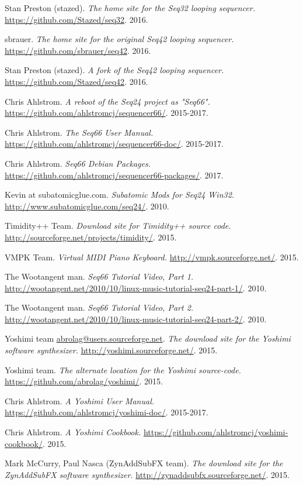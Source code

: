 \begin{thebibliography}{99}
   Stan Preston (stazed).
   \emph{The home site for the Seq32 looping sequencer.}
   \url{https://github.com/Stazed/seq32}.
   2016.

   sbrauer.
   \emph{The home site for the original Seq42 looping sequencer.}
   \url{https://github.com/sbrauer/seq42}.
   2016.

   Stan Preston (stazed).
   \emph{A fork of the Seq42 looping sequencer.}
   \url{https://github.com/Stazed/seq42}.
   2016.

   Chris Ahlstrom.
   \emph{A reboot of the Seq24 project as "Seq66".}
   \url{https://github.com/ahlstromcj/sequencer66/}.
   2015-2017.

   Chris Ahlstrom.
   \emph{The Seq66 User Manual.}
   \url{https://github.com/ahlstromcj/sequencer66-doc/}.
   2015-2017.

   Chris Ahlstrom.
   \emph{Seq66 Debian Packages.}
   \url{https://github.com/ahlstromcj/sequencer66-packages/}.
   2017.

   Kevin at subatomicglue.com.
   \emph{Subatomic Mods for Seq24 Win32.}
   \url{http://www.subatomicglue.com/seq24/}.
   2010.

   Timidity++ Team.
   \emph{Download site for Timidity++ source code.}
   \url{http://sourceforge.net/projects/timidity/}.
   2015.

   VMPK Team.
   \emph{Virtual MIDI Piano Keyboard.}
   \url{http://vmpk.sourceforge.net/}.
   2015.

   The Wootangent man.
   \emph{Seq66 Tutorial Video, Part 1.}
   \url{http://wootangent.net/2010/10/linux-music-tutorial-seq24-part-1/}.
   2010.

   The Wootangent man.
   \emph{Seq66 Tutorial Video, Part 2.}
   \url{http://wootangent.net/2010/10/linux-music-tutorial-seq24-part-2/}.
   2010.

   Yoshimi team \url{abrolag@users.sourceforge.net}.
   \emph{The download site for the Yoshimi software synthesizer.}
   \url{http://yoshimi.sourceforge.net/}.
   2015.

   Yoshimi team.
   \emph{The alternate location for the Yoshimi source-code.}
   \url{https://github.com/abrolag/yoshimi/}.
   2015.

   Chris Ahlstrom.
   \emph{A Yoshimi User Manual.}
   \url{https://github.com/ahlstromcj/yoshimi-doc/}.
   2015-2017.

   Chris Ahlstrom.
   \emph{A Yoshimi Cookbook.}
   \url{https://github.com/ahlstromcj/yoshimi-cookbook/}.
   2015.

   Mark McCurry, Paul Nasca (ZynAddSubFX team).
   \emph{The download site for the ZynAddSubFX software synthesizer.}
   \url{http://zynaddsubfx.sourceforge.net/}.
   2015.

\end{thebibliography}

